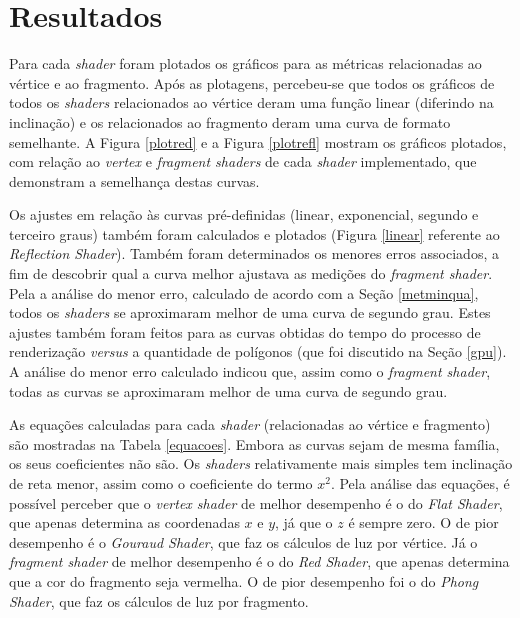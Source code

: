 \chapter[Resultados]{Resultados}
\label{result}

	Para cada \textit{shader} foram plotados os gráficos para as métricas relacionadas ao vértice e ao fragmento. Após as plotagens, percebeu-se que todos os gráficos de todos os \textit{shaders} relacionados ao vértice deram uma função linear (diferindo na inclinação) e os relacionados ao fragmento deram uma curva de formato semelhante. A Figura \ref{plotred} e a Figura \ref{plotrefl} mostram os gráficos plotados, com relação ao \textit{vertex} e \textit{fragment shaders} de cada \textit{shader} implementado, que demonstram a semelhança destas curvas.

	 Os ajustes em relação às curvas pré-definidas (linear, exponencial, segundo e terceiro graus) também foram calculados e plotados (Figura \ref{linear} referente ao \textit{Reflection Shader}). Também foram determinados os menores erros associados, a fim de descobrir qual a curva melhor ajustava as medições do \textit{fragment shader}. Pela a análise do menor erro, calculado de acordo com a Seção \ref{metminqua}, todos os \textit{shaders} se aproximaram melhor de uma curva de segundo grau. Estes ajustes também foram feitos para as curvas obtidas do tempo do processo de renderização \textit{versus} a quantidade de polígonos (que foi discutido na Seção \ref{gpu}). A análise do menor erro calculado indicou que, assim como o \textit{fragment shader}, todas as curvas se aproximaram melhor de uma curva de segundo grau.

	As equações calculadas para cada \textit{shader} (relacionadas ao vértice e fragmento) são mostradas na Tabela \ref{equacoes}. Embora as curvas sejam de mesma família, os seus coeficientes não são. Os \textit{shaders} relativamente mais simples tem inclinação de reta menor, assim como o coeficiente do termo $x^2$. Pela análise das equações, é possível perceber que o \textit{vertex shader} de melhor desempenho é o do \textit{Flat Shader}, que apenas determina as coordenadas $x$ e $y$, já que o $z$ é sempre zero. O de pior desempenho é o \textit{Gouraud Shader}, que faz os cálculos de luz por vértice. Já o \textit{fragment shader} de melhor desempenho é o do \textit{Red Shader}, que apenas determina que a cor do fragmento seja vermelha. O de pior desempenho foi o do \textit{Phong Shader}, que faz os cálculos de luz por fragmento.

